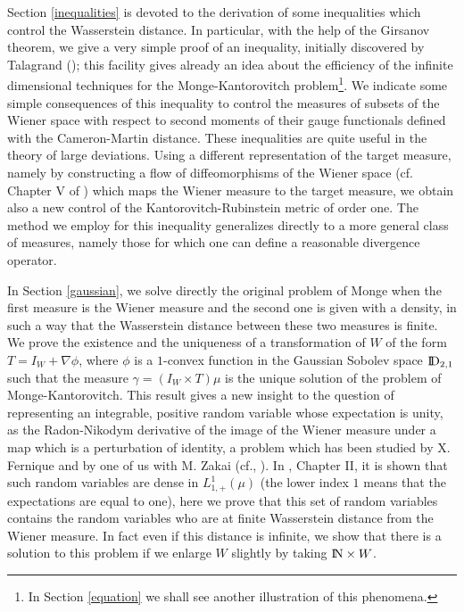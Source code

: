 \documentclass[12pt,a4paper]{book}
\newcommand{\NN}{{\rm I\!N}}
\newcommand{\DD}{{\rm I\!D}}
\newcommand{\ga}{\gamma}
\begin{document}
Section \ref{inequalities} is
devoted to the derivation of some inequalities which control the
Wasserstein distance. In particular, with the help of  the Girsanov
theorem, we give a very simple proof of an
inequality, initially  discovered by Talagrand (\cite{Tal}); this
facility gives already an idea about the efficiency of 
the infinite dimensional techniques for the Monge-Kantorovitch
problem{\footnote{In Section \ref{equation} we shall see another
    illustration of this phenomena.}}.  We indicate some simple
consequences of this inequality to 
control the measures of subsets of the Wiener space with respect to  second
moments of their  gauge functionals defined with  the
Cameron-Martin distance. These inequalities  are quite useful in the
theory of large deviations. Using a different representation of the
target measure, namely by constructing a flow of diffeomorphisms of
the Wiener space (cf. Chapter V of \cite{UZ7}) which maps the Wiener
measure to the target measure, we obtain also  a new control of the
Kantorovitch-Rubinstein 
metric of order one. The method we employ for this inequality
generalizes directly to a more general class of measures, namely those
for which one can define a reasonable divergence operator.

In Section \ref{gaussian}, we solve directly  the original problem of
Monge when the first measure is the Wiener measure and the second one is
given with a density, in such a way that the Wasserstein distance
between these two measures is finite. We prove the existence and the
uniqueness  of a
transformation of $W$ of the form $T=I_W+\nabla\phi$, where $\phi$ is a
$1$-convex function in the Gaussian Sobolev space $\DD_{2,1}$ such
that the measure $\ga=(I_W\times T)\mu$ is the unique solution of the
 problem of Monge-Kantorovitch.  This result gives
a new insight to the question  of representing an  integrable, positive
random variable whose expectation is unity,  as the Radon-Nikodym
derivative  of the image of the Wiener measure under a map which is a
perturbation of identity, a problem which has been studied by X. Fernique
and by one of us with M. Zakai (cf., \cite{Fer1,Fer2,UZ7}).  In \cite{UZ7},
Chapter II,  it is shown that such random 
variables are dense in $L^1_{1,+}(\mu)$ (the lower index $1$ means
that the expectations are equal to one), here we prove that this set
of random variables contains  the random variables who are at finite
Wasserstein distance from the Wiener measure. In fact even if this
distance is infinite, we show that there is a solution to this problem
if we  enlarge  $W$ slightly by taking $\NN\times W$. 
\end{document}
